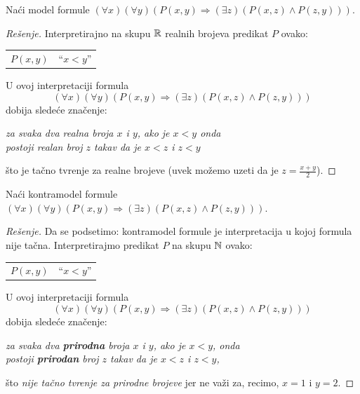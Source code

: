 \begin{EX}
  Na\'ci model formule $(\forall x)(\forall y)(P(x, y) \Rightarrow (\exists z)(P(x, z) \land P(z, y)))$.
\end{EX}
\begin{proof}[Re\v senje]
  Interpretirajno na skupu $\mathbb{R}$ realnih brojeva predikat $P$ ovako:
  \medskip

  \begin{tabular}{l@{\quad$\leadsto$\quad}l}
    $P(x, y)$ & \enquote{$x < y$}\\
  \end{tabular}
  
  \medskip
  
  \noindent
  U ovoj interpretaciji formula
  $$
    (\forall x)(\forall y)(P(x, y) \Rightarrow (\exists z)(P(x, z) \land P(z, y)))
  $$
  dobija slede\'ce zna\v cenje:
  \begin{center}
    \textit{za svaka dva realna broja $x$ i $y$, ako je $x < y$ onda}\\
    \textit{postoji realan broj $z$ takav da je $x < z$ i $z < y$}
  \end{center}
  \v sto je ta\v cno tvr\dj enje za realne brojeve (uvek mo\v zemo uzeti da je $z = \frac{x+y}{2}$).
\end{proof}

\begin{EX}
  Na\'ci kontramodel formule $(\forall x)(\forall y)(P(x, y) \Rightarrow (\exists z)(P(x, z) \land P(z, y)))$.
\end{EX}
\begin{proof}[Re\v senje]
  Da se podsetimo: kontramodel formule je interpretacija u kojoj formula nije ta\v cna.
  Interpretirajmo predikat $P$ na skupu $\mathbb{N}$ ovako:

  \medskip

  \begin{tabular}{l@{\quad$\leadsto$\quad}l}
    $P(x, y)$ & \enquote{$x < y$}\\
  \end{tabular}
  
  \medskip
  
  \noindent
  U ovoj interpretaciji formula
  $$
    (\forall x)(\forall y)(P(x, y) \Rightarrow (\exists z)(P(x, z) \land P(z, y)))
  $$
  dobija slede\'ce zna\v cenje:
  \begin{center}
    \textit{za svaka dva \textbf{prirodna} broja $x$ i $y$, ako je $x < y$, onda}\\
    \textit{postoji \textbf{prirodan} broj $z$ takav da je $x < z$ i $z < y$,}
  \end{center}
  \v sto \emph{nije ta\v cno tvr\dj enje za prirodne brojeve} jer ne va\v zi za, recimo, $x = 1$ i $y = 2$.
\end{proof}

